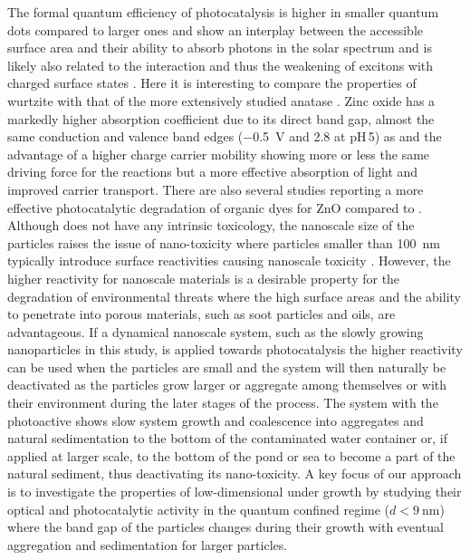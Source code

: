 \documentclass[9pt,twoside,twocolumn]{article}\usepackage{knitr}
\begin{document}
\begin{refsection}
The formal quantum efficiency of photocatalysis is higher in smaller  quantum dots compared to larger ones and show an interplay between the accessible surface area and their ability to absorb photons in the solar spectrum \cite{Jacobsson2012} and is likely also related to the interaction and thus the weakening of excitons with charged surface states \cite{Jacobsson2014}.
Here it is interesting to compare the properties of wurtzite  with that of the more extensively studied anatase .
Zinc oxide has a markedly higher absorption coefficient due to its direct band gap, almost the same conduction and valence band edges (\qty{-0.5}{\volt} and \qty{+2.8}{\voltNHE} at \mbox{pH\,5}) as  and the advantage of a higher charge carrier mobility \cite{Boschloo2006} showing more or less the same driving force for the reactions but a more effective absorption of light and improved carrier transport.
There are also several studies reporting a more effective photocatalytic degradation of organic dyes for ZnO compared to  \cite{Sakthivel2003,Muruganandham2006,Yan2009a}.
Although  does not have any intrinsic toxicology, the nanoscale size of the particles raises the issue of nano-toxicity where particles smaller than \qty{100}{\nm} typically introduce surface reactivities causing nanoscale toxicity \cite{Maynard2011, Maynard2011a}.
However, the higher reactivity for nanoscale materials is a desirable property for the degradation of environmental threats where the high surface areas and the ability to penetrate into porous materials, such as soot particles and oils, are advantageous.
If a dynamical nanoscale system, such as the slowly growing nanoparticles in this study, is applied towards photocatalysis the higher reactivity can be used when the particles are small and the system will then naturally be deactivated as the particles grow larger or aggregate among themselves or with their environment during the later stages of the process.
The system with the photoactive  shows slow system growth and coalescence into aggregates and natural sedimentation to the bottom of the contaminated water container or, if applied at larger scale, to the bottom of the pond or sea to become a part of the natural sediment, thus deactivating its nano-toxicity.
A key focus of our approach is to investigate the properties of low-dimensional  under growth by studying their optical and photocatalytic activity in the quantum confined regime ($d<\qty{9}{\nm}$) where the band gap of the particles changes during their growth with eventual aggregation and sedimentation for larger particles.


\end{refsection}
\end{document}
